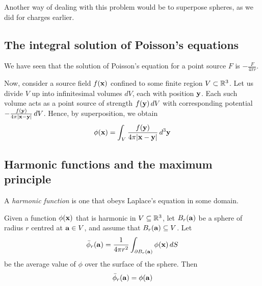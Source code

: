 \documentclass{../../template/note}
\begin{document}
    \begin{remark*}
        Another way of dealing with this problem would be to superpose spheres, as we did for charges earlier.
    \end{remark*}
    
    \subsection{The integral solution of Poisson's equations}

    We have seen that the solution of Poisson's equation for a point source \(F\) is \(-\frac{F}{4\pi r}\).

    Now, consider a source field \(f(\V x)\) confined to some finite region \(V \subset \mathbb R^3\). Let us divide \(V\) up into infinitesimal volumes \(dV\), each with position \(\V y\). Each such volume acts as a point source of strength \(f(\V y) \D V\) with corresponding potential \(-\frac{f(\V y)}{4\pi|\V x-\V y|} \D V\). Hence, by superposition, we obtain
    \begin{align*}
        \phi(\V x) = \int_V \frac{f(\V y)}{4\pi |\V x - \V y|} \, d^3 \V y
    \end{align*}
    
    \subsection{Harmonic functions and the maximum principle}

    \begin{definition*}
        A \emph{harmonic function} is one that obeys Laplace's equation in some domain.
    \end{definition*}

    \begin{proposition*}
        Given a function \(\phi(\V x)\) that is harmonic in \(V \subseteq \mathbb R^3\), let \(B_r(\V a)\) be a sphere of radius \(r\) centred at \(\V a \in V\), and assume that \(B_r(\V a) \subseteq V\). Let
        \begin{align*}
            \bar{\phi}_r(\V a) = \frac 1 {4\pi r^2}\int_{\pr B_r(\V a)} \phi(\V x) \D S
        \end{align*}
        be the average value of \(\phi\) over the surface of the sphere. Then
        \begin{align*}
            \bar{\phi}_r(\V a) = \phi(\V a)
        \end{align*}
    \end{proposition*}
    
\end{document}
